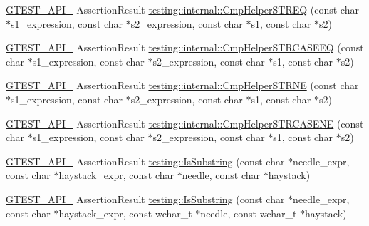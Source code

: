 \begin{DoxyCompactItemize}
\item 
\mbox{\hyperlink{_obj__test_2lib_2googletest-release-1_88_81_2googletest_2include_2gtest_2internal_2gtest-port_8h_aa73be6f0ba4a7456180a94904ce17790}{G\+T\+E\+S\+T\+\_\+\+A\+P\+I\+\_\+}} Assertion\+Result \mbox{\hyperlink{namespacetesting_1_1internal_a711a396ed8f636ecd14a850a89d181b6}{testing\+::internal\+::\+Cmp\+Helper\+S\+T\+R\+EQ}} (const char $\ast$s1\+\_\+expression, const char $\ast$s2\+\_\+expression, const char $\ast$s1, const char $\ast$s2)
\item 
\mbox{\hyperlink{_obj__test_2lib_2googletest-release-1_88_81_2googletest_2include_2gtest_2internal_2gtest-port_8h_aa73be6f0ba4a7456180a94904ce17790}{G\+T\+E\+S\+T\+\_\+\+A\+P\+I\+\_\+}} Assertion\+Result \mbox{\hyperlink{namespacetesting_1_1internal_a30dfeb01f1bc8087c7d05205d5fa75c1}{testing\+::internal\+::\+Cmp\+Helper\+S\+T\+R\+C\+A\+S\+E\+EQ}} (const char $\ast$s1\+\_\+expression, const char $\ast$s2\+\_\+expression, const char $\ast$s1, const char $\ast$s2)
\item 
\mbox{\hyperlink{_obj__test_2lib_2googletest-release-1_88_81_2googletest_2include_2gtest_2internal_2gtest-port_8h_aa73be6f0ba4a7456180a94904ce17790}{G\+T\+E\+S\+T\+\_\+\+A\+P\+I\+\_\+}} Assertion\+Result \mbox{\hyperlink{namespacetesting_1_1internal_af2d31c77ce73e1003a64bd7ca3564bbe}{testing\+::internal\+::\+Cmp\+Helper\+S\+T\+R\+NE}} (const char $\ast$s1\+\_\+expression, const char $\ast$s2\+\_\+expression, const char $\ast$s1, const char $\ast$s2)
\item 
\mbox{\hyperlink{_obj__test_2lib_2googletest-release-1_88_81_2googletest_2include_2gtest_2internal_2gtest-port_8h_aa73be6f0ba4a7456180a94904ce17790}{G\+T\+E\+S\+T\+\_\+\+A\+P\+I\+\_\+}} Assertion\+Result \mbox{\hyperlink{namespacetesting_1_1internal_a7e31d489f06ab8f6a81a7729f0c377e7}{testing\+::internal\+::\+Cmp\+Helper\+S\+T\+R\+C\+A\+S\+E\+NE}} (const char $\ast$s1\+\_\+expression, const char $\ast$s2\+\_\+expression, const char $\ast$s1, const char $\ast$s2)
\item 
\mbox{\hyperlink{_obj__test_2lib_2googletest-release-1_88_81_2googletest_2include_2gtest_2internal_2gtest-port_8h_aa73be6f0ba4a7456180a94904ce17790}{G\+T\+E\+S\+T\+\_\+\+A\+P\+I\+\_\+}} Assertion\+Result \mbox{\hyperlink{namespacetesting_a390c4f66fe7e9098117eb77e5fffa4ad}{testing\+::\+Is\+Substring}} (const char $\ast$needle\+\_\+expr, const char $\ast$haystack\+\_\+expr, const char $\ast$needle, const char $\ast$haystack)
\item 
\mbox{\hyperlink{_obj__test_2lib_2googletest-release-1_88_81_2googletest_2include_2gtest_2internal_2gtest-port_8h_aa73be6f0ba4a7456180a94904ce17790}{G\+T\+E\+S\+T\+\_\+\+A\+P\+I\+\_\+}} Assertion\+Result \mbox{\hyperlink{namespacetesting_aa1c82529c7591d2a9fd016de45dd9113}{testing\+::\+Is\+Substring}} (const char $\ast$needle\+\_\+expr, const char $\ast$haystack\+\_\+expr, const wchar\+\_\+t $\ast$needle, const wchar\+\_\+t $\ast$haystack)

\end{DoxyCompactItemize}

